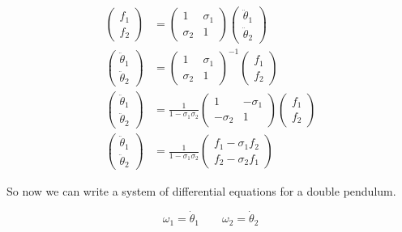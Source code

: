 \documentclass[11pt,a4paper]{article}
\begin{document}
\begin{align*}
\begin{pmatrix} f_1 \\ f_2 \end{pmatrix} &= \begin{pmatrix} 1 & \sigma_1 \\ \sigma_2 & 1 \end{pmatrix} \begin{pmatrix} \ddot{\theta}_1 \\ \ddot{\theta}_2 \end{pmatrix} \\
\begin{pmatrix} \ddot{\theta}_1 \\ \ddot{\theta}_2 \end{pmatrix} &= \begin{pmatrix} 1 & \sigma_1 \\ \sigma_2 & 1 \end{pmatrix}^{-1} \begin{pmatrix} f_1 \\ f_2 \end{pmatrix} \\
\begin{pmatrix} \ddot{\theta}_1 \\ \ddot{\theta}_2 \end{pmatrix} &= \frac{1}{1 - \sigma_1 \sigma_2} \begin{pmatrix} 1 & -\sigma_1 \\ -\sigma_2 & 1 \end{pmatrix} \begin{pmatrix} f_1 \\ f_2 \end{pmatrix} \\
\begin{pmatrix} \ddot{\theta}_1 \\ \ddot{\theta}_2 \end{pmatrix} &= \frac{1}{1 - \sigma_1 \sigma_2} \begin{pmatrix} f_1 - \sigma_1 f_2 \\ f_2 - \sigma_2 f_1 \end{pmatrix}
\end{align*}

So now we can write a system of differential equations for a double pendulum.

\[ \omega_1 = \dot{\theta}_1 \qquad \omega_2 = \dot{\theta}_2 \]
\end{document}

